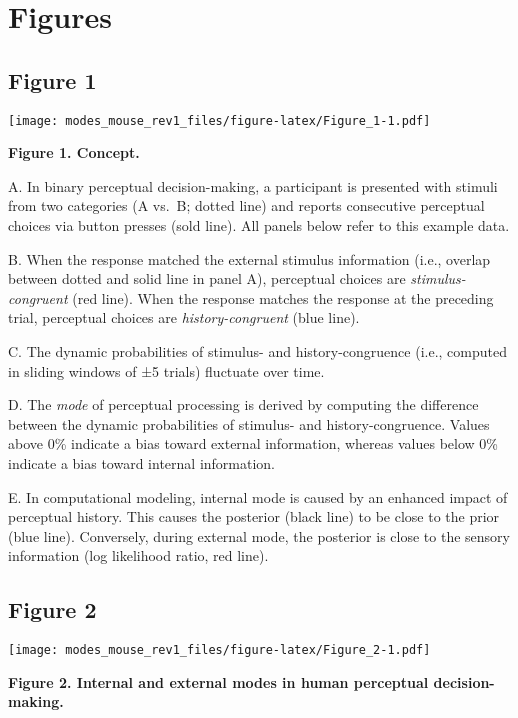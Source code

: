 \documentclass[
]{article}
\begin{document}
\hypertarget{figures}{%
\section{Figures}\label{figures}}

\hypertarget{figure-1}{%
\subsection{Figure 1}\label{figure-1}}

\texttt{[image: modes\_mouse\_rev1\_files/figure-latex/Figure\_1-1.pdf]}

\textbf{Figure 1. Concept.}

A. In binary perceptual decision-making, a participant is presented with
stimuli from two categories (A vs.~B; dotted line) and reports
consecutive perceptual choices via button presses (sold line). All
panels below refer to this example data.

B. When the response matched the external stimulus information (i.e.,
overlap between dotted and solid line in panel A), perceptual choices
are \emph{stimulus-congruent} (red line). When the response matches the
response at the preceding trial, perceptual choices are
\emph{history-congruent} (blue line).

C. The dynamic probabilities of stimulus- and history-congruence (i.e.,
computed in sliding windows of ±5 trials) fluctuate over time.

D. The \emph{mode} of perceptual processing is derived by computing the
difference between the dynamic probabilities of stimulus- and
history-congruence. Values above 0\% indicate a bias toward external
information, whereas values below 0\% indicate a bias toward internal
information.

E. In computational modeling, internal mode is caused by an enhanced
impact of perceptual history. This causes the posterior (black line) to
be close to the prior (blue line). Conversely, during external mode, the
posterior is close to the sensory information (log likelihood ratio, red
line).

\newpage

\hypertarget{figure-2}{%
\subsection{Figure 2}\label{figure-2}}

\texttt{[image: modes\_mouse\_rev1\_files/figure-latex/Figure\_2-1.pdf]}

\textbf{Figure 2. Internal and external modes in human perceptual
decision-making.}
\end{document}
